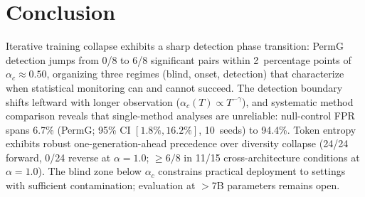 \section{Conclusion}
\label{sec:conclusion}

Iterative training collapse exhibits a sharp detection phase transition: PermG detection jumps from 0/8 to 6/8 significant pairs within 2~percentage points of $\alpha_c \approx 0.50$, organizing three regimes (blind, onset, detection) that characterize when statistical monitoring can and cannot succeed.
The detection boundary shifts leftward with longer observation ($\alpha_c(T) \propto T^{-\gamma}$), and systematic method comparison reveals that single-method analyses are unreliable: null-control FPR spans 6.7\% (PermG; 95\% CI $[1.8\%, 16.2\%]$, 10~seeds) to 94.4\%.
Token entropy exhibits robust one-generation-ahead precedence over diversity collapse (24/24 forward, 0/24 reverse at $\alpha{=}1.0$; ${\geq}6/8$ in 11/15 cross-architecture conditions at $\alpha{=}1.0$).
The blind zone below $\alpha_c$ constrains practical deployment to settings with sufficient contamination; evaluation at ${>}$7B parameters remains open.
